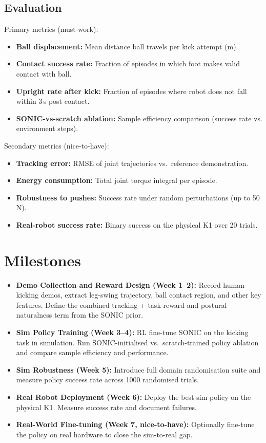 \documentclass[12pt]{article}
\begin{document}
\subsection{Evaluation}
Primary metrics (must-work):
\begin{itemize}[noitemsep]
    \item \textbf{Ball displacement:} Mean distance ball travels per kick attempt (m).
    \item \textbf{Contact success rate:} Fraction of episodes in which foot makes valid contact with ball.
    \item \textbf{Upright rate after kick:} Fraction of episodes where robot does not fall within 3\,s post-contact.
    \item \textbf{SONIC-vs-scratch ablation:} Sample efficiency comparison (success rate vs. environment steps).
\end{itemize}
Secondary metrics (nice-to-have):
\begin{itemize}[noitemsep]
    \item \textbf{Tracking error:} RMSE of joint trajectories vs.\ reference demonstration.
    \item \textbf{Energy consumption:} Total joint torque integral per episode.
    \item \textbf{Robustness to pushes:} Success rate under random perturbations (up to 50\,N).
    \item \textbf{Real-robot success rate:} Binary success on the physical K1 over 20 trials.
\end{itemize}

\section{Milestones}
\begin{itemize}[noitemsep]
    \item \textbf{Demo Collection and Reward Design (Week 1--2):} Record human kicking demos, extract leg-swing trajectory, ball contact region, and other key features. Define the combined tracking + task reward and postural naturalness term from the SONIC prior.
    \item \textbf{Sim Policy Training (Week 3--4):} RL fine-tune SONIC on the kicking task in simulation. Run SONIC-initialised vs.\ scratch-trained policy ablation and compare sample efficiency and performance.
    \item \textbf{Sim Robustness (Week 5):} Introduce full domain randomisation suite and measure policy success rate across 1000 randomised trials.
    \item \textbf{Real Robot Deployment (Week 6):} Deploy the best sim policy on the physical K1. Measure success rate and document failures.
    \item \textbf{Real-World Fine-tuning (Week 7, nice-to-have):} Optionally fine-tune the policy on real hardware to close the sim-to-real gap.
\end{itemize}
\end{document}
